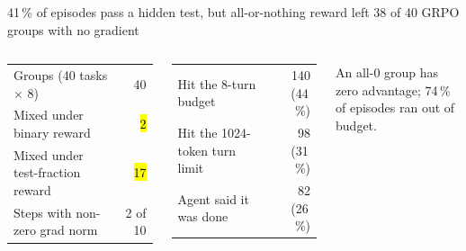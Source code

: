 \begin{frame}{41\,\% of episodes pass a hidden test, but all-or-nothing reward left 38 of 40 GRPO groups with no gradient}
\begin{columns}[T]
\scriptsize\setlength{\tabcolsep}{3pt}
\begin{tabularx}{\linewidth}{@{}Yr@{}}
\toprule
Groups (40 tasks $\times$ 8) & 40\\
Mixed under binary reward & \hl{2}\\
Mixed under test-fraction reward & \hl{17}\\
Steps with non-zero grad norm & 2 of 10\\
\bottomrule
\end{tabularx}
\par\vspace{1.5mm}
\scriptsize
\begin{tabularx}{\linewidth}{@{}Yr@{}}
\toprule
Hit the 8-turn budget & 140 (44\,\%)\\
Hit the 1024-token turn limit & 98 (31\,\%)\\
Agent said it was done & 82 (26\,\%)\\
\bottomrule
\end{tabularx}
\par\vspace{1.5mm}
{\tiny An all-0 group has zero advantage; 74\,\% of episodes ran out of budget.\par}
\end{columns}
\end{frame}

